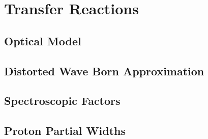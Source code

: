 \section{Transfer Reactions}



\subsection{Optical Model} \label{subsec:Optical_Model}

\subsection{Distorted Wave Born Approximation} \label{subsec:DWBA}

\subsection{Spectroscopic Factors} \label{subsec:C2S}

\subsection{Proton Partial Widths} \label{subsec:PartialWidths}